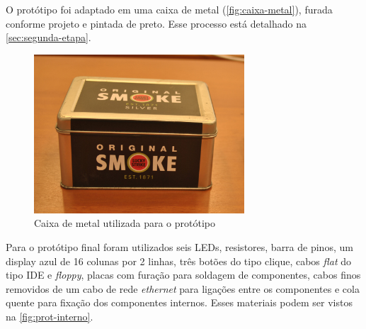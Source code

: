 O protótipo foi adaptado em uma caixa de metal (\autoref{fig:caixa-metal}), furada conforme projeto e pintada de preto. Esse processo está detalhado na \autoref{sec:segunda-etapa}. 

\begin{figure}[htb]
	\caption{\label{fig:caixa-metal}Caixa de metal utilizada para o protótipo}
	\begin{center}
		\includegraphics[width=0.7\textwidth]{img/caixa-metal.jpg}
	\end{center}
\end{figure}

Para o protótipo final foram utilizados seis LEDs, resistores, barra de pinos, um display azul de 16 colunas por 2 linhas, três botões do tipo clique, cabos \textit{flat} do tipo IDE e \textit{floppy}, placas com furação para soldagem de componentes, cabos finos removidos de um cabo de rede \textit{ethernet} para ligações entre os componentes e cola quente para fixação dos componentes internos. Esses materiais podem ser vistos na \autoref{fig:prot-interno}.

